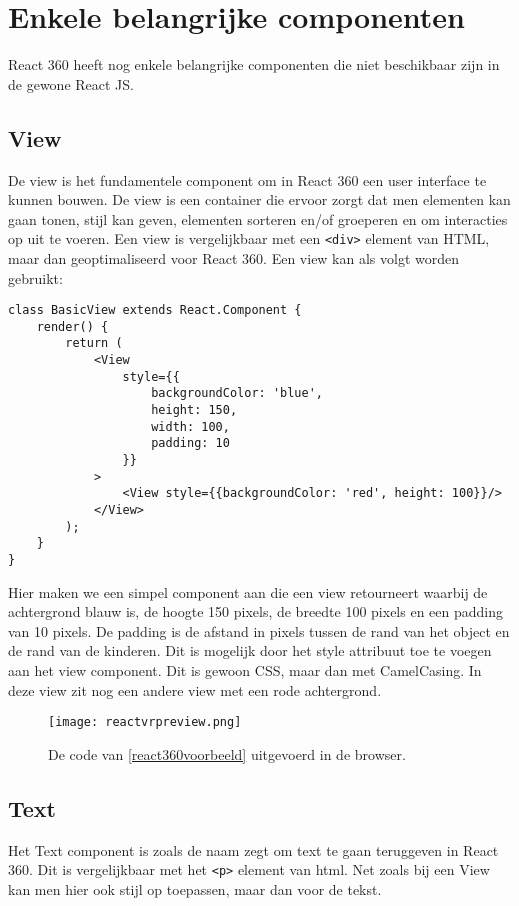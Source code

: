 \section{Enkele belangrijke componenten}
\label{sec:reactvr-componenten}
React 360 heeft nog enkele belangrijke componenten die niet beschikbaar zijn in de gewone React JS.

\subsection{View}
\label{subsec:view}
De view is het fundamentele component om in React 360 een user interface te kunnen bouwen. De view is een container die ervoor zorgt dat men elementen kan gaan tonen, stijl kan geven, elementen sorteren en/of groeperen en om interacties op uit te voeren. Een view is vergelijkbaar met een \lstinline[basicstyle=\ttfamily\color{red}]|<div>| element van HTML, maar dan geoptimaliseerd voor React 360. Een view kan als volgt worden gebruikt:

\begin{lstlisting}[frame=single, caption=Een component die een View teruggeeft., label={react360voorbeeld}]
class BasicView extends React.Component {
	render() {
		return (
			<View 
				style={{
					backgroundColor: 'blue',
					height: 150,
					width: 100,
					padding: 10
				}}
			>
				<View style={{backgroundColor: 'red', height: 100}}/>
			</View>
		);
	}
}
\end{lstlisting}

Hier maken we een simpel component aan die een view retourneert waarbij de achtergrond blauw is, de hoogte 150 pixels, de breedte 100 pixels en een padding van 10 pixels. De padding is de afstand in pixels tussen de rand van het object en de rand van de kinderen. Dit is mogelijk door het style attribuut toe te voegen aan het view component. Dit is gewoon CSS, maar dan met CamelCasing. In deze view zit nog een andere view met een rode achtergrond.

\begin{figure}[h]
	\centering
	\texttt{[image: reactvrpreview.png]}
	\caption{De code van \ref{react360voorbeeld} uitgevoerd in de browser.}
	\label{fig:react360preview}
\end{figure}


\subsection{Text}
\label{subsec:text}
Het Text component is zoals de naam zegt om text te gaan teruggeven in React 360. Dit is vergelijkbaar met het \lstinline[basicstyle=\ttfamily\color{red}]|<p>| element van html. Net zoals bij een View kan men hier ook stijl op toepassen, maar dan voor de tekst.

